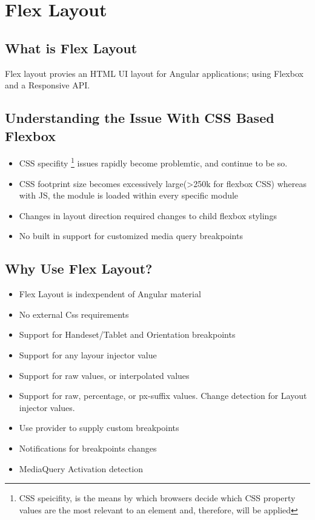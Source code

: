 \maketitle{}
\section{ Flex Layout }


\subsection{ What is Flex Layout }
Flex layout provies an HTML UI layout for Angular applications; using Flexbox
and a Responsive API.

\subsection{ Understanding the Issue With CSS Based Flexbox }
\begin{itemize}
  \item CSS specifity \footnote{CSS speicifity, is the means by which browsers
  decide which CSS property values are the most relevant to an element and,
  therefore, will be applied} issues rapidly become problemtic, and continue
  to be so.
  \item CSS footprint size becomes excessively large(>250k for flexbox CSS)
  whereas with JS, the module is loaded within every specific module
  \item Changes in layout direction required changes to child flexbox stylings
  \item No built in support for customized media query breakpoints 
\end{itemize}

\subsection{ Why Use Flex Layout? }
\begin{itemize}
  \item Flex Layout is indexpendent of Angular material
  \item No external Css requirements
  \item Support for Handeset/Tablet and Orientation breakpoints
  \item Support for any layour injector value
  \item Support for raw values, or interpolated values
  \item Support for raw, percentage, or px-suffix values. Change detection
  for Layout injector values.
  \item Use provider to supply custom breakpoints
  \item Notifications for breakpoints changes
  \item MediaQuery Activation detection
\end{itemize}

